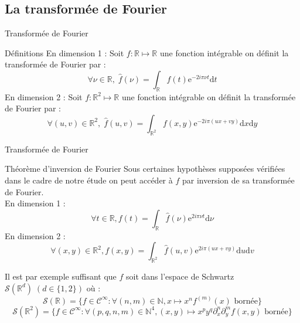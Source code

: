 \documentclass{beamer}
\newcommand*{\N}{\mathbb{N}}
\newcommand*{\R}{\mathbb{R}}
\newcommand*{\dd}[1]{\mathrm{d}#1}
\begin{document}
\subsection{La transformée de Fourier}
\begin{frame}{Transformée de Fourier}
    \begin{beamerboxesrounded}{Définitions}
        En dimension 1 : Soit $f : \R \longmapsto \R$ une fonction intégrable on définit la transformée de Fourier par : 
        $$\forall \nu \in \R, \; \widehat{f}(\nu) = \int_{\R} f(t)\mathrm{e}^{-2 i \pi \nu t } \dd t$$  
        En dimension 2 : Soit $f : \R^2 \longmapsto \R$ une fonction intégrable on définit la transformée de Fourier par : 
        $$\forall (u,v) \in \R^2, \; \widehat{f}(u,v) = \int_{\R^2} f(x,y) \mathrm{e}^{-2 i \pi (ux + vy)} \dd x \dd y $$
    \end{beamerboxesrounded}
\end{frame}
\begin{frame}{Transformée de Fourier}
    \begin{beamerboxesrounded}{Théorème d'inversion de Fourier}
        Sous certaines hypothèses supposées vérifiées dans le cadre de notre étude on peut accéder à $f$ par inversion de sa transformée de Fourier.  \\
        En dimension 1 : $$\forall t \in \R, f(t) = \int_{\R} \widehat{f}(\nu)\mathrm{e}^{2i\pi \nu t} \dd \nu$$
        En dimension 2 : $$\forall (x,y) \in \R^2, f(x,y) = \int_{\R^2} \widehat{f}(u,v)\mathrm{e}^{2i\pi (ux + vy)} \dd u \dd v$$
    \end{beamerboxesrounded}
Il est par exemple suffisant que $f$ soit dans l'espace de Schwartz $\mathcal{S}(\R^d) \; (d \in \{1,2\})$ où : 
$$\mathcal{S}(\R) = \{f \in \mathcal{C}^{\infty} : \forall (n,m) \in \N, x \mapsto x^{n} f^{(m)}(x) \text{ bornée} \}$$
$$\mathcal{S}(\R^2) = \{f \in \mathcal{C}^{\infty} : \forall (p,q,n,m) \in \N^4, (x,y) \mapsto x^{p}y^q \partial_x^n \partial_y^m f(x,y) \text{ bornée}\}$$
\end{frame}
\end{document}
